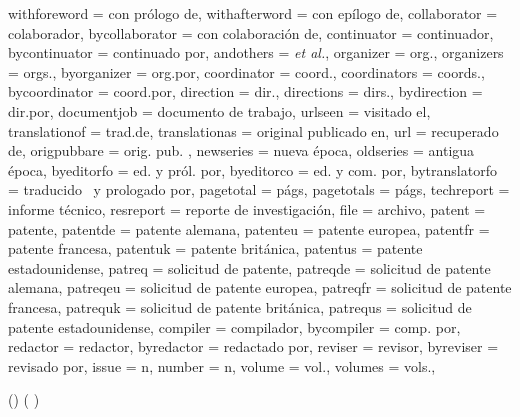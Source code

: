 {withforeword     = {con prólogo de},
withafterword    = {con epílogo de},
collaborator     = {colaborador},
bycollaborator   = {con colaboración de},
continuator      = {continuador},
bycontinuator    = {continuado por},
andothers        = {\emph{et al\adddot}},
organizer        = {org\adddot},
organizers       = {orgs\adddot},
byorganizer      = {org\adddot\addspace por},
coordinator      = {coord\adddot},
coordinators     = {coords\adddot},
bycoordinator    = {coord\adddot\addspace por},
direction        = {dir\adddot},
directions       = {dirs\adddot},
bydirection      = {dir\adddot\addspace por},
documentjob      = {documento de trabajo},
urlseen          = {visitado el\addspace},
translationof    = {trad\adddot\addspace de},
translationas    = {original publicado en},
url              = {recuperado de},
origpubbare      = {orig\adddotspace pub\adddotspace},
newseries        = {nueva época},
oldseries        = {antigua época},
byeditorfo       = {ed\adddotspace y pról\adddotspace por},
byeditorco       = {ed\adddotspace y com\adddotspace por},
bytranslatorfo   = {traducido \lbx@lfromlang\ y prologado por},
pagetotal        = {págs},
pagetotals       = {págs},
techreport       = {informe técnico},
resreport        = {reporte de investigación},
file             = {archivo},
patent           = {patente},
patentde         = {patente alemana},
patenteu         = {patente europea},
patentfr         = {patente francesa},
patentuk         = {patente británica},
patentus         = {patente estadounidense},
patreq           = {solicitud de patente},
patreqde         = {solicitud de patente alemana},
patreqeu         = {solicitud de patente europea},
patreqfr         = {solicitud de patente francesa},
patrequk         = {solicitud de patente británica},
patrequs         = {solicitud de patente estadounidense},
compiler       = {compilador},
bycompiler       = {comp\adddotspace por},
redactor         = {redactor},
byredactor       = {redactado por},
reviser          = {revisor},
byreviser        = {revisado por},
issue            = {n},
number           = {n},
volume           = {vol\adddot},
volumes          = {vols\adddot},
}

\makeatletter
{}
\makeatother

\DeclareCiteCommand{\titleyear}
{}
{%
}
{\multicitedelim}
{}

\DeclareCiteCommand{\citeyearpar}
{}
{%
	{(\bibhyperref{\printdate})}
	{%
		{(\bibhyperref{\printdate}}
		{%
			\ifnumequal{\value{citecount}}{\value{citetotal}}
			{\addcomma\addspace\bibhyperref{\printdate})}
			{\addcomma\addspace\bibhyperref{\printdate}}%
		}%
	}%
}
{}
{}
